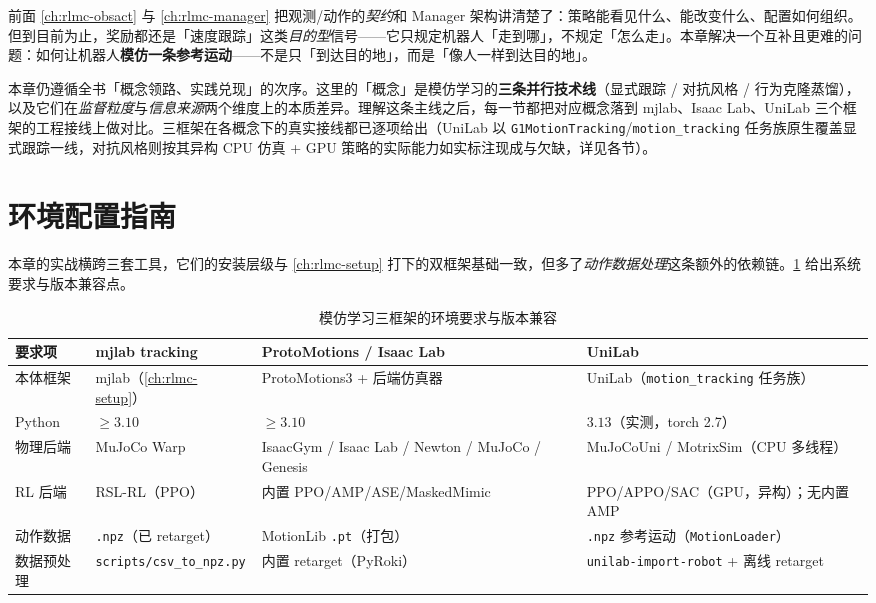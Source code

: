 前面 \cref{ch:rlmc-obsact} 与 \cref{ch:rlmc-manager} 把观测/动作的\emph{契约}和 Manager 架构讲清楚了：策略能看见什么、能改变什么、配置如何组织。但到目前为止，奖励都还是「速度跟踪」这类\emph{目的型}信号——它只规定机器人「走到哪」，不规定「怎么走」。本章解决一个互补且更难的问题：如何让机器人\textbf{模仿一条参考运动}——不是只「到达目的地」，而是「像人一样到达目的地」。

本章仍遵循全书「概念领路、实践兑现」的次序。这里的「概念」是模仿学习的\textbf{三条并行技术线}（显式跟踪 / 对抗风格 / 行为克隆蒸馏），以及它们在\emph{监督粒度}与\emph{信息来源}两个维度上的本质差异。理解这条主线之后，每一节都把对应概念落到 mjlab、Isaac Lab、UniLab 三个框架的工程接线上做对比。三框架在各概念下的真实接线都已逐项给出（UniLab 以 \texttt{G1MotionTracking}/\texttt{motion\_tracking} 任务族原生覆盖显式跟踪一线，对抗风格则按其异构 CPU 仿真 + GPU 策略的实际能力如实标注现成与欠缺，详见各节）。

\section*{环境配置指南}
\label{sec:rlmc-imit-setup}

本章的实战横跨三套工具，它们的安装层级与 \cref{ch:rlmc-setup} 打下的双框架基础一致，但多了\emph{动作数据处理}这条额外的依赖链。\cref{tab:rlmc-imit-req} 给出系统要求与版本兼容点。

\begin{table}[ht]
\centering
\small
\caption{模仿学习三框架的环境要求与版本兼容}
\label{tab:rlmc-imit-req}
\begin{tabular}{@{}llll@{}}
\toprule
要求项 & mjlab tracking & ProtoMotions / Isaac Lab & UniLab \\
\midrule
本体框架 & mjlab（\cref{ch:rlmc-setup}） & ProtoMotions3 + 后端仿真器 & UniLab（\texttt{motion\_tracking} 任务族） \\
Python & $\ge 3.10$ & $\ge 3.10$ & $3.13$（实测，torch 2.7） \\
物理后端 & MuJoCo Warp & IsaacGym / Isaac Lab / Newton / MuJoCo / Genesis & MuJoCoUni / MotrixSim（CPU 多线程） \\
RL 后端 & RSL-RL（PPO） & 内置 PPO/AMP/ASE/MaskedMimic & PPO/APPO/SAC（GPU，异构）；无内置 AMP \\
动作数据 & \texttt{.npz}（已 retarget） & MotionLib \texttt{.pt}（打包） & \texttt{.npz} 参考运动（\texttt{MotionLoader}） \\
数据预处理 & \texttt{scripts/csv\_to\_npz.py} & 内置 retarget（PyRoki） & \texttt{unilab-import-robot} + 离线 retarget \\
\bottomrule
\end{tabular}
\end{table}

